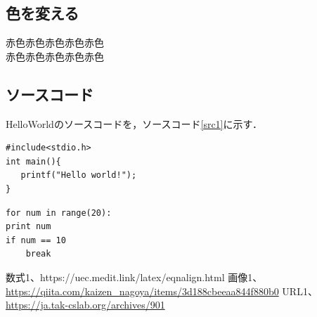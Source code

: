 \documentclass[a4j,uplatex,titlepage]{jsarticle}
\begin{document}
\subsection{色を変える}
\color{red}赤色赤色赤色赤色赤色\color{black}\\
\color{blue}赤色赤色赤色赤色赤色\color{black}
\subsection{ソースコード}
HelloWorldのソースコードを，ソースコード\ref{src1}に示す．
\begin{lstlisting}[caption=C,label=src1]
#include<stdio.h>
int main(){
   printf("Hello world!");
}
\end{lstlisting}

\begin{lstlisting}[caption=Python,label=src1]
for num in range(20):
print num
if num == 10
    break
\end{lstlisting}

\clearpage

\begin{thebibliography}{99}
 数式1、https://uec.medit.link/latex/eqnalign.html
 画像1、\url{https://qiita.com/kaizen_nagoya/items/3d188cbeeaa844f880b0}
 URL1、\url{https://ja.tak-cslab.org/archives/901}
\end{thebibliography}
\end{document}
